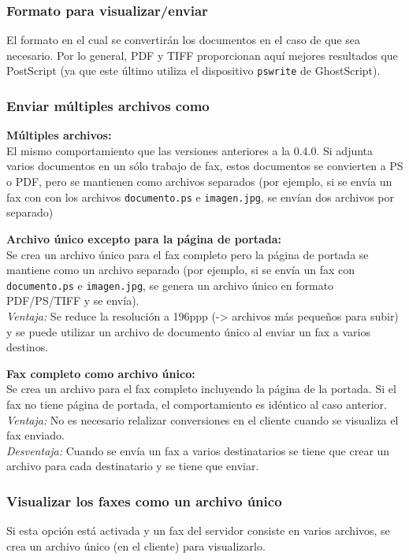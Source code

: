 \documentclass[a4paper,10pt]{scrartcl}
\begin{document}
\subsubsection{Formato para visualizar/enviar}

El formato en el cual se convertirán los documentos en el caso de que sea necesario. Por lo general, PDF y TIFF proporcionan aquí mejores resultados que PostScript (ya que este último utiliza el dispositivo \texttt{pswrite} de GhostScript).

\subsubsection{Enviar múltiples archivos como}

{\parindent0pt
\textbf{Múltiples archivos:}\\
El mismo comportamiento que las versiones anteriores a la 0.4.0. Si adjunta varios documentos en un sólo trabajo de fax, estos documentos se convierten a PS o PDF, pero se mantienen como archivos separados (por ejemplo, si se envía un fax con con los archivos \texttt{documento.ps} e \texttt{imagen.jpg}, se envían dos archivos por separado)
\medskip

\textbf{Archivo único excepto para la página de portada:}\\
Se crea un archivo único para el fax completo pero la página de portada se mantiene como un archivo separado (por ejemplo, si se envía un fax con \texttt{documento.ps} e \texttt{imagen.jpg}, se genera un archivo único en formato PDF/PS/TIFF y se envía).\\
\textit{Ventaja:} Se reduce la resolución a 196ppp (-> archivos más pequeños para subir) y se puede utilizar un archivo de documento único al enviar un fax a varios destinos.
\medskip

\textbf{Fax completo como archivo único:}\\
Se crea un archivo para el fax completo incluyendo la página de la portada. Si el fax no tiene página de portada, el comportamiento es idéntico al caso anterior.\\
\textit{Ventaja:} No es necesario relalizar conversiones en el cliente cuando se visualiza el fax enviado.\\
\textit{Desventaja:} Cuando se envía un fax a varios destinatarios se tiene que crear un archivo para cada destinatario y se tiene que enviar.
}

\subsubsection{Visualizar los faxes como un archivo único}
Si esta opción está activada y un fax del servidor consiste en varios archivos, se crea un archivo único (en el cliente) para visualizarlo.
\end{document}
